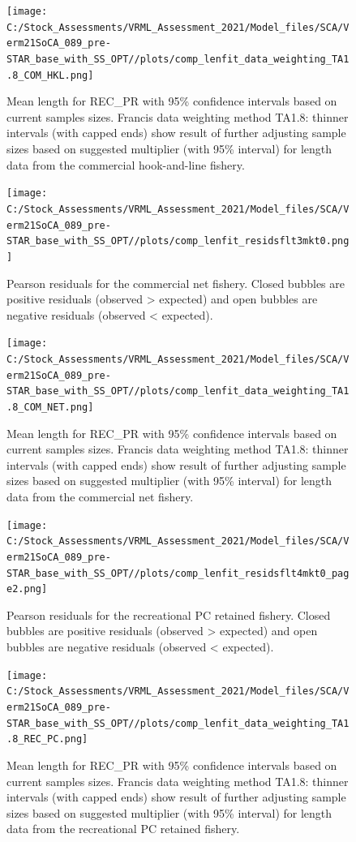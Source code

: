 \documentclass[
  english,
  a4paper,
]{article}
\begin{document}
\begin{figure}
\centering
\texttt{[image: C:/Stock\_Assessments/VRML\_Assessment\_2021/Model\_files/SCA/Verm21SoCA\_089\_pre-STAR\_base\_with\_SS\_OPT//plots/comp\_lenfit\_data\_weighting\_TA1.8\_COM\_HKL.png]}
\caption{Mean length for REC\_PR with 95\% confidence intervals based on current samples sizes. Francis data weighting method TA1.8: thinner intervals (with capped ends) show result of further adjusting sample sizes based on suggested multiplier (with 95\% interval) for length data from the commercial hook-and-line fishery.\label{fig:mean-len-fit-COM_HKL}}
\end{figure}

\begin{figure}
\centering
\texttt{[image: C:/Stock\_Assessments/VRML\_Assessment\_2021/Model\_files/SCA/Verm21SoCA\_089\_pre-STAR\_base\_with\_SS\_OPT//plots/comp\_lenfit\_residsflt3mkt0.png]}
\caption{Pearson residuals for the commercial net fishery. Closed bubbles are positive residuals (observed \textgreater{} expected) and open bubbles are negative residuals (observed \textless{} expected).\label{fig:len-pearson-COM_NET}}
\end{figure}

\begin{figure}
\centering
\texttt{[image: C:/Stock\_Assessments/VRML\_Assessment\_2021/Model\_files/SCA/Verm21SoCA\_089\_pre-STAR\_base\_with\_SS\_OPT//plots/comp\_lenfit\_data\_weighting\_TA1.8\_COM\_NET.png]}
\caption{Mean length for REC\_PR with 95\% confidence intervals based on current samples sizes. Francis data weighting method TA1.8: thinner intervals (with capped ends) show result of further adjusting sample sizes based on suggested multiplier (with 95\% interval) for length data from the commercial net fishery.\label{fig:mean-len-fit-COM_NET}}
\end{figure}

\begin{figure}
\centering
\texttt{[image: C:/Stock\_Assessments/VRML\_Assessment\_2021/Model\_files/SCA/Verm21SoCA\_089\_pre-STAR\_base\_with\_SS\_OPT//plots/comp\_lenfit\_residsflt4mkt0\_page2.png]}
\caption{Pearson residuals for the recreational PC retained fishery. Closed bubbles are positive residuals (observed \textgreater{} expected) and open bubbles are negative residuals (observed \textless{} expected).\label{fig:len-pearson-REC_PC}}
\end{figure}

\begin{figure}
\centering
\texttt{[image: C:/Stock\_Assessments/VRML\_Assessment\_2021/Model\_files/SCA/Verm21SoCA\_089\_pre-STAR\_base\_with\_SS\_OPT//plots/comp\_lenfit\_data\_weighting\_TA1.8\_REC\_PC.png]}
\caption{Mean length for REC\_PR with 95\% confidence intervals based on current samples sizes. Francis data weighting method TA1.8: thinner intervals (with capped ends) show result of further adjusting sample sizes based on suggested multiplier (with 95\% interval) for length data from the recreational PC retained fishery.\label{fig:mean-len-fit-REC_PC}}
\end{figure}
\end{document}
